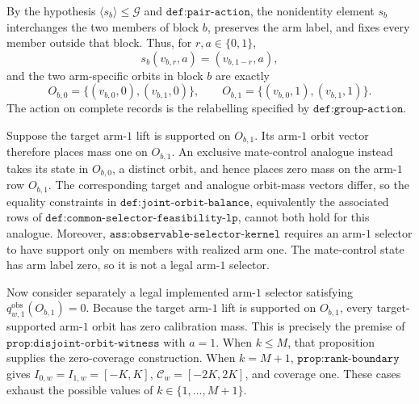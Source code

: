 By the hypothesis \(\langle s_b\rangle\le\mathcal G\) and \(\texttt{def:pair-action}\), the nonidentity element \(s_b\) interchanges the two members of block \(b\), preserves the arm label, and fixes every member outside that block. Thus, for \(r,a\in\{0,1\}\),
\[s_b(v_{b,r},a)=(v_{b,1-r},a),\]
and the two arm-specific orbits in block \(b\) are exactly
\[O_{b,0}=\{(v_{b,0},0),(v_{b,1},0)\},\qquad O_{b,1}=\{(v_{b,0},1),(v_{b,1},1)\}.\]
The action on complete records is the relabelling specified by \(\texttt{def:group-action}\).

Suppose the target arm-\(1\) lift is supported on \(O_{b,1}\). Its arm-\(1\) orbit vector therefore places mass one on \(O_{b,1}\). An exclusive mate-control analogue instead takes its state in \(O_{b,0}\), a distinct orbit, and hence places zero mass on the arm-\(1\) row \(O_{b,1}\). The corresponding target and analogue orbit-mass vectors differ, so the equality constraints in \(\texttt{def:joint-orbit-balance}\), equivalently the associated rows of \(\texttt{def:common-selector-feasibility-lp}\), cannot both hold for this analogue. Moreover, \(\texttt{ass:observable-selector-kernel}\) requires an arm-\(1\) selector to have support only on members with realized arm one. The mate-control state has arm label zero, so it is not a legal arm-\(1\) selector.

Now consider separately a legal implemented arm-\(1\) selector satisfying \(q^{\mathrm{obs}}_{w,1}(O_{b,1})=0\). Because the target arm-\(1\) lift is supported on \(O_{b,1}\), every target-supported arm-\(1\) orbit has zero calibration mass. This is precisely the premise of \(\texttt{prop:disjoint-orbit-witness}\) with \(a=1\). When \(k\le M\), that proposition supplies the zero-coverage construction. When \(k=M+1\), \(\texttt{prop:rank-boundary}\) gives \(I_{0,w}=I_{1,w}=[-K,K]\), \(\mathcal C_w=[-2K,2K]\), and coverage one. These cases exhaust the possible values of \(k\in\{1,\ldots,M+1\}\).